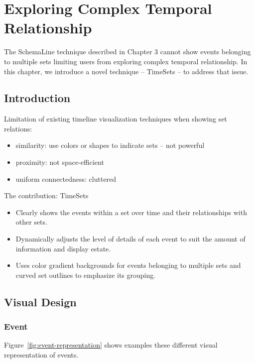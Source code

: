 \chapter{Exploring Complex Temporal Relationship}
\label{chap:timesets}

\graphicspath{{Chapter4/figures/}}
The SchemaLine technique described in Chapter 3 cannot show events belonging to multiple sets limiting users from exploring complex temporal relationship. In this chapter, we introduce a novel technique -- TimeSets -- to address that issue. 


\section{Introduction}
Limitation of existing timeline visualization techniques when showing set relations:

\begin{itemize}
	\item similarity: use colors or shapes to indicate sets -- not powerful 
	\item proximity: not space-efficient
	\item uniform connectedness: cluttered
\end{itemize}

The contribution: TimeSets
\begin{itemize}
	\item Clearly shows the events within a set over time and their relationships with other sets.
	\item Dynamically adjusts the level of details of each event to suit the amount of information and display estate.
	\item Uses color gradient backgrounds for events belonging to multiple sets and curved set outlines to emphasize its grouping.
\end{itemize}

\section{Visual Design}

\subsection{Event}
Figure~\ref{fig:event-representation} shows examples these different visual representation of events.

